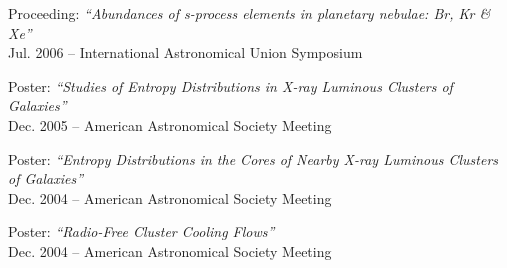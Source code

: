 \documentclass[11pt]{cv}
\begin{document}
\begin{llist}
{\sc Proceeding: {\textit{``Abundances of s-process elements in planetary nebulae: Br, Kr \& Xe''}}}\\
Jul. 2006 -- International Astronomical Union Symposium

{\sc Poster: {\textit{``Studies of Entropy Distributions in X-ray Luminous Clusters of Galaxies''}}}\\
Dec. 2005 -- American Astronomical Society Meeting

{\sc Poster: {\textit{``Entropy Distributions in the Cores of Nearby X-ray Luminous Clusters of Galaxies''}}}\\
Dec. 2004 -- American Astronomical Society Meeting

{\sc Poster: {\textit{``Radio-Free Cluster Cooling Flows''}}}\\
Dec. 2004 -- American Astronomical Society Meeting



\end{llist}
\end{document}
